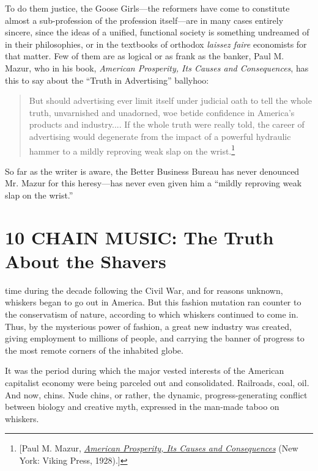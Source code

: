 \documentclass[twoside,nohyper,openany,nobib]{tufte-book}
\let\oldchapter\chapter
\def\chapter{%
  \setcounter{footnote}{0}%
  \oldchapter
}
\begin{document}
To do them justice, the Goose Girls---the reformers have come to
constitute almost a sub-profession of the profession itself---are in
many cases entirely sincere, since the ideas of a unified, functional
society is something undreamed of in their philosophies, or in the
textbooks of orthodox \emph{laissez faire} economists for that matter.
Few of them are as logical or as frank as the banker, Paul M. Mazur, who
in his book, \emph{American Prosperity, Its Causes and Consequences},
has this to say about the ``Truth in Advertising'' ballyhoo:

\begin{quote}
But should advertising ever limit itself under judicial oath to tell the
whole truth, unvarnished and unadorned, woe betide confidence in
America's products and industry.... If the whole truth were really told,
the career of advertising would degenerate from the impact of a powerful
hydraulic hammer to a mildly reproving weak slap on the wrist.\footnote{{[}Paul M. Mazur,
  \emph{\href{https://www.worldcat.org/title/american-prosperity-its-causes-and-consequences/oclc/289643}{American
  Prosperity, Its Causes and Consequences}} (New York: Viking Press,
  1928).{]}}
\end{quote}

So far as the writer is aware, the Better Business Bureau has never
denounced Mr. Mazur for this heresy---has never even given him a
``mildly reproving weak slap on the wrist.''


\chapter[10 \hspace*{1mm} CHAIN MUSIC: The Truth About the Shavers]{10 CHAIN MUSIC: The Truth About the Shavers}

 time during the decade following the Civil War, and for reasons
unknown, whiskers began to go out in America. But this fashion mutation
ran counter to the conservatism of nature, according to which whiskers
continued to come in. Thus, by the mysterious power of fashion, a great
new industry was created, giving employment to millions of people, and
carrying the banner of progress to the most remote corners of the
inhabited globe.

It was the period during which the major vested interests of the
American capitalist economy were being parceled out and consolidated.
Railroads, coal, oil. And now, chins. Nude chins, or rather, the
dynamic, progress-generating conflict between biology and creative myth,
expressed in the man-made taboo on whiskers.
\end{document}
